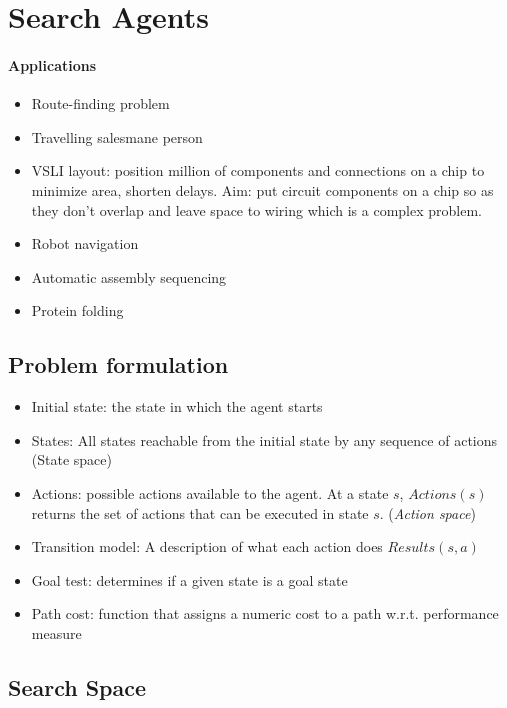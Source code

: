 \section{Search Agents}

\paragraph{Applications}
\begin{itemize}
  \item Route-finding problem
  \item Travelling salesmane person
  \item VSLI layout: position million of components and
    connections on a chip to minimize area, shorten delays. Aim:
    put circuit components on a chip so as they don’t overlap and
    leave space to wiring which is a complex problem.
  \item Robot navigation
  \item Automatic assembly sequencing
  \item Protein folding
\end{itemize}

\subsection{Problem formulation}

\begin{itemize}
  \item Initial state: the state in which the agent starts
  \item States: All states reachable from the initial state by
    any sequence of actions (State space)
  \item Actions: possible actions available to the agent. At a
    state $s$, $Actions(s)$ returns the set of actions that can be
    executed in state $s$. (\textit{Action space})
  \item Transition model: A description of what each action does
    $Results(s, a)$
  \item Goal test: determines if a given state is a goal state
  \item Path cost: function that assigns a numeric cost to a path
    w.r.t. performance measure
\end{itemize}

\subsection{Search Space}

